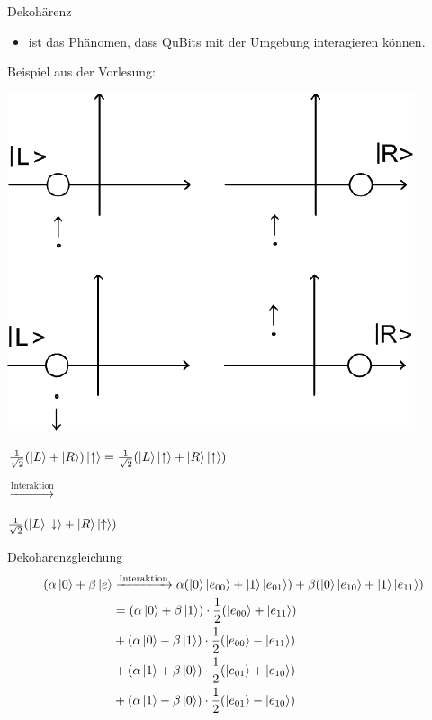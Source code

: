 \documentclass[fleqn,compress,utf8,aspectratio=169,t]{beamer}
\begin{document}
\begin{frame}{Dekohärenz}
\begin{itemize}
	\item ist das Phänomen, dass QuBits mit der Umgebung interagieren können.
\end{itemize}

Beispiel aus der Vorlesung:

\begin{minipage}{.5\textwidth}
\centering
\includegraphics[width=.7\textwidth]{images/3a.png}
\end{minipage}%
\begin{minipage}{.5\textwidth}
\centering
$\frac{1}{\sqrt2}(\ket{L} + \ket{R}) \ket{\uparrow} = \frac{1}{\sqrt2}(\ket{L} \ket{\uparrow} + \ket{R} \ket{\uparrow})$

\vspace{1em}

$\xrightarrow{\text{Interaktion}}$

\vspace{1em}

$\frac{1}{\sqrt2}(\ket{L} \ket{\downarrow} + \ket{R} \ket{\uparrow})$
\end{minipage}%
\end{frame}

\begin{frame}{Dekohärenzgleichung}
\[
\begin{aligned}
(\alpha \ket{0} + \beta \ket{e} &\xrightarrow{\text{Interaktion}} \alpha (\ket{0} \ket{e_{00}} + \ket{1} \ket{e_{01}}) + \beta(\ket{0} \ket{e_{10}} + \ket{1} \ket{e_{11}})\\
&= (\alpha \ket{0} + \beta \ket{1}) \cdot \frac{1}{2}(\ket{e_{00}} + \ket{e_{11}})\\
&+ (\alpha \ket{0} - \beta \ket{1}) \cdot \frac{1}{2}(\ket{e_{00}} - \ket{e_{11}})\\
&+ (\alpha \ket{1} + \beta \ket{0}) \cdot \frac{1}{2}(\ket{e_{01}} + \ket{e_{10}})\\
&+ (\alpha \ket{1} - \beta \ket{0}) \cdot \frac{1}{2}(\ket{e_{01}} - \ket{e_{10}})\\
\end{aligned}
\]
\end{frame}
\end{document}
